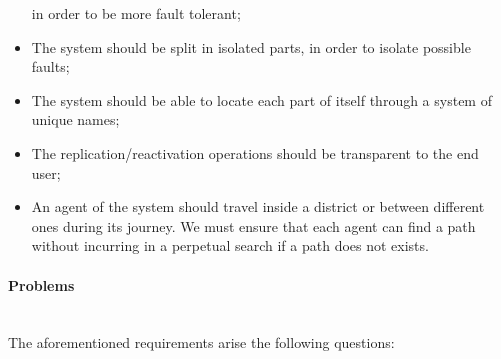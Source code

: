\begin{itemize}
  in order to be more fault tolerant;
\item The system should be split in isolated parts, in order to isolate
  possible faults;
\item The system should be able to locate each part of itself through a system
  of unique names;
\item The replication/reactivation operations should be transparent to the end
  user;
\item An agent of the system should travel inside a district or between
different ones during its journey. We must ensure that each agent can find a path
without incurring in a perpetual search if a path does not exists.
\end{itemize}

\paragraph{Problems} \mbox{} \\

The aforementioned requirements arise the following questions:

